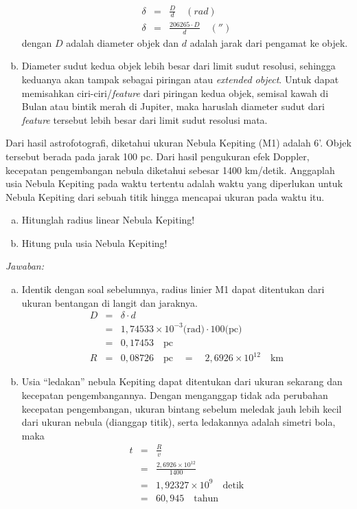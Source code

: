 \documentclass[11pt,fleqn, a4paper]{exam}
\begin{document}
\begin{questions}
\begin{enumerate}[(a)]
\begin{eqnarray*}
\delta &=& \frac{D}{d} \quad (rad)\\
\delta &=& \frac{206265 \cdot D}{d} \quad ('')
\end{eqnarray*}
dengan $D$ adalah diameter objek dan $d$ adalah jarak dari pengamat ke objek.

\item Diameter sudut kedua objek lebih besar dari limit sudut resolusi, sehingga keduanya akan tampak sebagai piringan atau \textit{extended object}. Untuk dapat memisahkan ciri-ciri/\textit{feature} dari piringan kedua objek, semisal kawah di Bulan atau bintik merah di Jupiter, maka haruslah diameter sudut dari \textit{feature} tersebut lebih besar dari limit sudut resolusi mata. 
\end{enumerate}


\vspace{0.5cm}
\question Dari hasil astrofotografi, diketahui ukuran Nebula Kepiting (M1) adalah 6'. Objek tersebut berada pada jarak 100 pc. Dari hasil pengukuran efek Doppler, kecepatan pengembangan nebula diketahui sebesar 1400 km/detik. Anggaplah usia Nebula Kepiting pada waktu tertentu adalah waktu yang diperlukan untuk Nebula Kepiting dari sebuah titik hingga mencapai ukuran pada waktu itu.
\begin{enumerate}[(a)]
\item Hitunglah radius linear Nebula Kepiting!
\item Hitung pula usia Nebula Kepiting!
\end{enumerate}

\textit{Jawaban:}
\begin{enumerate}[(a)]
\item Identik dengan soal sebelumnya, radius linier M1 dapat ditentukan dari ukuran bentangan di langit dan jaraknya.
\begin{eqnarray*}
D &=& \delta \cdot d\\
&=& 1,74533 \times 10^{-3} \text{(rad)} \cdot 100 \text{(pc)}\\
&=& 0,17453 \quad \text{pc}\\
R &=& 0,08726 \quad \text{pc} \quad = \quad 2,6926 \times 10^{12} \quad \text{km} 
\end{eqnarray*}

\item Usia ``ledakan'' nebula Kepiting dapat ditentukan dari ukuran sekarang dan kecepatan pengembangannya. Dengan menganggap tidak ada perubahan kecepatan pengembangan, ukuran bintang sebelum meledak jauh lebih kecil dari ukuran nebula (dianggap titik), serta ledakannya adalah simetri bola, maka
\begin{eqnarray*}
t &=& \frac{R}{v}\\
  &=& \frac{2,6926 \times 10^{12}}{1400}\\
  &=& 1,92327 \times 10^{9} \quad \text{detik} \\
  &=& 60,945 \quad \text{tahun}
\end{eqnarray*}
\end{enumerate}



\end{questions}
\end{document}
